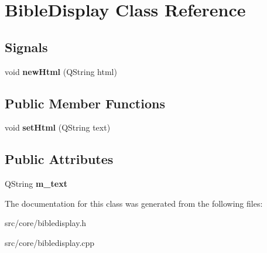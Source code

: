 \hypertarget{classBibleDisplay}{
\section{BibleDisplay Class Reference}
\label{classBibleDisplay}
}
\subsection*{Signals}
\begin{DoxyCompactItemize}
\item 
\hypertarget{classBibleDisplay_a948236487001ee84aaaf8f9c571db775}{
void {\bfseries newHtml} (QString html)}
\label{classBibleDisplay_a948236487001ee84aaaf8f9c571db775}

\end{DoxyCompactItemize}
\subsection*{Public Member Functions}
\begin{DoxyCompactItemize}
\item 
\hypertarget{classBibleDisplay_aee6fccab0d12a335b60bda57930cfe43}{
void {\bfseries setHtml} (QString text)}
\label{classBibleDisplay_aee6fccab0d12a335b60bda57930cfe43}

\end{DoxyCompactItemize}
\subsection*{Public Attributes}
\begin{DoxyCompactItemize}
\item 
\hypertarget{classBibleDisplay_a255d5b9ad80ac7ea64a5a6d78b63cd9b}{
QString {\bfseries m\_\-text}}
\label{classBibleDisplay_a255d5b9ad80ac7ea64a5a6d78b63cd9b}

\end{DoxyCompactItemize}


The documentation for this class was generated from the following files:\begin{DoxyCompactItemize}
\item 
src/core/bibledisplay.h\item 
src/core/bibledisplay.cpp\end{DoxyCompactItemize}
